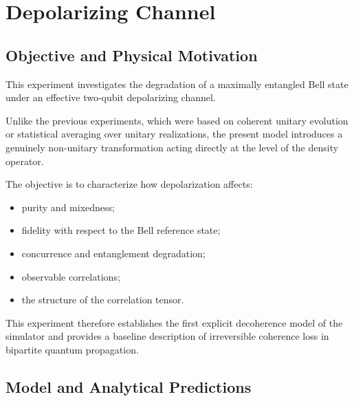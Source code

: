 
\newpage

\section{Depolarizing Channel}
\label{sec:depolarizing_channel}


\subsection*{Objective and Physical Motivation}

This experiment investigates the degradation of a maximally entangled Bell state under an effective two-qubit depolarizing channel.

Unlike the previous experiments, which were based on coherent unitary evolution or statistical averaging over unitary realizations, the present model introduces a genuinely non-unitary transformation acting directly at the level of the density operator.

The objective is to characterize how depolarization affects:

\begin{itemize}
    \item purity and mixedness;
    \item fidelity with respect to the Bell reference state;
    \item concurrence and entanglement degradation;
    \item observable correlations;
    \item the structure of the correlation tensor.
\end{itemize}

This experiment therefore establishes the first explicit decoherence model of the simulator and provides a baseline description of irreversible coherence loss in bipartite quantum propagation.


\subsection*{Model and Analytical Predictions}

